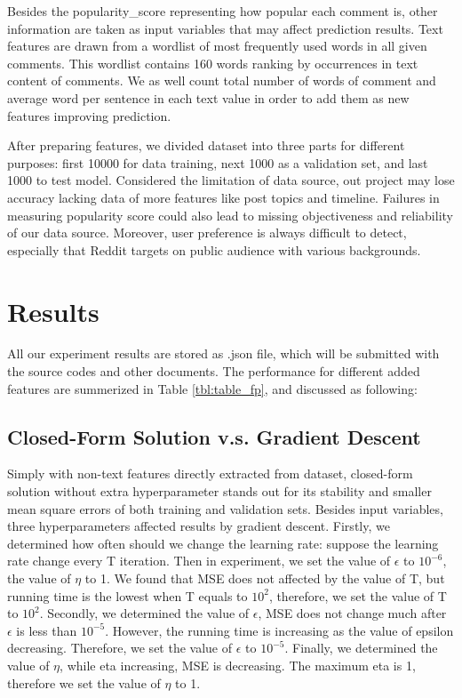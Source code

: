 \documentclass[letterpaper, 11pt]{article}
\begin{document}
Besides the popularity\_score representing how popular each comment is, other information are taken as input variables that may affect prediction results. Text features are drawn from a wordlist of most frequently used words in all given comments. This wordlist contains 160 words ranking by occurrences in text content of comments. We as well count total number of words of comment and average word per sentence in each text value in order to add them as new features improving prediction.

After preparing features, we divided dataset into three parts for different purposes: first 10000 for data training, next 1000 as a validation set, and last 1000 to test model. Considered the limitation of data source, out project may lose accuracy lacking data of more features like post topics and timeline. Failures in measuring popularity score could also lead to missing objectiveness and reliability of our data source. Moreover, user preference is always difficult to detect, especially that Reddit targets on public audience with various backgrounds.

\section*{Results}

All our experiment results are stored as .json file, which will be submitted with the source codes and other documents. The performance for different added features are summerized in Table \ref{tbl:table_fp}, and discussed as following:

\subsection*{Closed-Form Solution v.s. Gradient Descent}

Simply with non-text features directly extracted from dataset, closed-form solution without extra hyperparameter stands out for its stability and smaller mean square errors of both training and validation sets. Besides input variables, three hyperparameters affected results by gradient descent. Firstly, we determined how often should we change the learning rate: suppose the learning rate change every T iteration. Then in experiment, we set the value of $\epsilon$ to $10^{-6}$, the value of $\eta$ to 1. We found that MSE does not affected by the value of T, but running time is the lowest when T equals to $10^{2}$, therefore, we set the value of T to $10^{2}$. Secondly, we determined the value of $\epsilon$, MSE does not change much after $\epsilon$ is less than $10^{-5}$. However, the running time is increasing as the value of epsilon decreasing. Therefore, we set the value of $\epsilon$ to $10^{-5}$. Finally, we determined the value of $\eta$, while eta increasing, MSE is decreasing. The maximum eta is 1, therefore we set the value of $\eta$ to 1.
\end{document}
